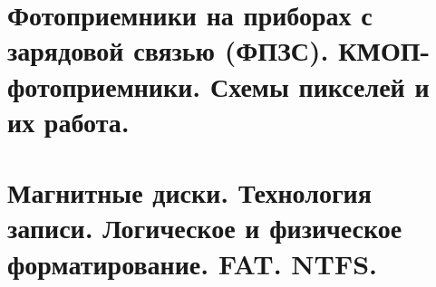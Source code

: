 	\section{Фотоприемники на приборах с зарядовой связью (ФПЗС). КМОП-фотоприемники. Схемы пикселей и их работа.}
	
	\section{Магнитные диски.  Технология записи.  Логическое и физическое форматирование. FAT. NTFS.}
	
